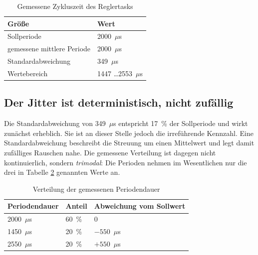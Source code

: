 \begin{table}[htbp]
    \centering
    \caption{Gemessene Zykluszeit des Reglertasks}
    \label{tab:jitter}
    \begin{tabular}{ll}
        \hline
        Größe & Wert \\
        \hline
        Sollperiode                 & 2000~$\mu$s \\
        gemessene mittlere Periode  & 2000~$\mu$s \\
        Standardabweichung          & 349~$\mu$s \\
        Wertebereich                & 1447 \ldots 2553~$\mu$s \\
        \hline
    \end{tabular}
\end{table}

\subsection*{Der Jitter ist deterministisch, nicht zufällig}

Die Standardabweichung von 349~$\mu$s entspricht 17~\% der Sollperiode und wirkt zunächst
erheblich. Sie ist an dieser Stelle jedoch die irreführende Kennzahl. Eine
Standardabweichung beschreibt die Streuung um einen Mittelwert und legt damit zufälliges
Rauschen nahe. Die gemessene Verteilung ist dagegen nicht kontinuierlich, sondern
\emph{trimodal}: Die Perioden nehmen im Wesentlichen nur die drei in Tabelle
\ref{tab:jitter_verteilung} genannten Werte an.

\begin{table}[htbp]
    \centering
    \caption{Verteilung der gemessenen Periodendauer}
    \label{tab:jitter_verteilung}
    \begin{tabular}{lll}
        \hline
        Periodendauer & Anteil & Abweichung vom Sollwert \\
        \hline
        2000~$\mu$s & 60~\% & 0 \\
        1450~$\mu$s & 20~\% & $-550$~$\mu$s \\
        2550~$\mu$s & 20~\% & $+550$~$\mu$s \\
        \hline
    \end{tabular}
\end{table}

